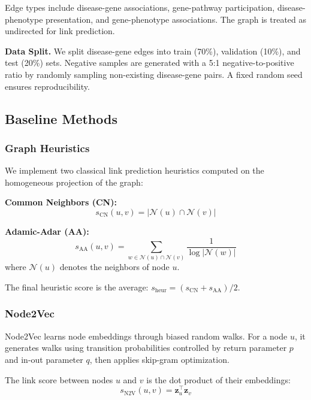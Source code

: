 \documentclass{article}
\newcommand{\vect}[1]{\mathbf{#1}}
\newcommand{\set}[1]{\mathcal{#1}}
\begin{document}
Edge types include disease-gene associations, gene-pathway participation, disease-phenotype presentation, and gene-phenotype associations. The graph is treated as undirected for link prediction.

\textbf{Data Split.} We split disease-gene edges into train (70\%), validation (10\%), and test (20\%) sets. Negative samples are generated with a 5:1 negative-to-positive ratio by randomly sampling non-existing disease-gene pairs. A fixed random seed ensures reproducibility.

\subsection{Baseline Methods}

\subsubsection{Graph Heuristics}

We implement two classical link prediction heuristics computed on the homogeneous projection of the graph:

\textbf{Common Neighbors (CN):}
\begin{equation}
    s_{\text{CN}}(u, v) = |\set{N}(u) \cap \set{N}(v)|
\end{equation}

\textbf{Adamic-Adar (AA):}
\begin{equation}
    s_{\text{AA}}(u, v) = \sum_{w \in \set{N}(u) \cap \set{N}(v)} \frac{1}{\log |\set{N}(w)|}
\end{equation}
where $\set{N}(u)$ denotes the neighbors of node $u$.

The final heuristic score is the average: $s_{\text{heur}} = (s_{\text{CN}} + s_{\text{AA}})/2$.

\subsubsection{Node2Vec}

Node2Vec \citep{grover2016node2vec} learns node embeddings through biased random walks. For a node $u$, it generates walks using transition probabilities controlled by return parameter $p$ and in-out parameter $q$, then applies skip-gram optimization.

The link score between nodes $u$ and $v$ is the dot product of their embeddings:
\begin{equation}
    s_{\text{N2V}}(u, v) = \vect{z}_u^\top \vect{z}_v
\end{equation}
\end{document}
